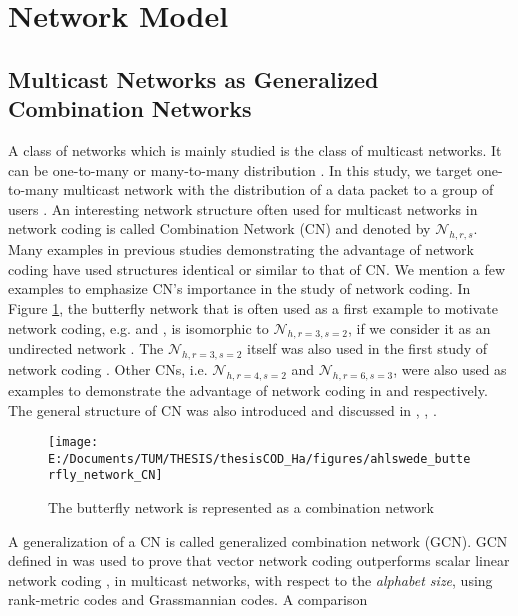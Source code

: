 \section{Network Model}

\subsection{Multicast Networks as Generalized Combination Networks}

A class of networks which is mainly studied is the class of multicast
networks. It can be one-to-many or many-to-many distribution \cite{Harte:2008}.
In this study, we target one-to-many multicast network with the distribution
of a data packet to a group of users \cite{Zhang:2012}. An interesting
network structure often used for multicast networks in network coding
is called Combination Network (CN) and denoted by $\mathcal{N}_{h,r,s}$.
Many examples in previous studies demonstrating the advantage of network
coding have used structures identical or similar to that of CN. We
mention a few examples to emphasize CN's importance in the study of
network coding. In Figure \ref{fig:butterfly_nw_cn}, the butterfly
network that is often used as a first example to motivate network
coding, e.g. \cite[Fig. 7]{Ahlswede:2000} and \cite[Fig. 1]{Sanders:2003},
is isomorphic to $\mathcal{N}_{h,r=3,s=2}$, if we consider it as
an undirected network \cite{Maheshwar:2012}. The $\mathcal{N}_{h,r=3,s=2}$
itself was also used in the first study of network coding \cite{Ahlswede:2000}.
Other CNs, i.e. $\mathcal{N}_{h,r=4,s=2}$ and $\mathcal{N}_{h,r=6,s=3}$,
were also used as examples to demonstrate the advantage of network
coding in \cite[Fig. 2]{Sanders:2003} and \cite[Fig. 2]{Jaggi:2005}
respectively. The general structure of CN was also introduced and
discussed in \cite[Sec. 4.3]{Fragouli:2006}, \cite[Sec. 4.1]{Yeung:2006},
\cite{Ngai:2004,Xiao:2007}.
\begin{figure}[H]
\caption{The butterfly network is represented as a combination network \label{fig:butterfly_nw_cn}}

\centering{}\texttt{[image: E:/Documents/TUM/THESIS/thesisCOD\_Ha/figures/ahlswede\_butterfly\_network\_CN]}
\end{figure}
A generalization of a CN \cite{Riis:2006} is called generalized combination
network (GCN). GCN defined in \cite{Etzion:2016,Wachter-Zeh:2018}
was used to prove that vector network coding outperforms scalar linear
network coding , in multicast networks, with respect to the \textit{alphabet
size}, using rank-metric codes and Grassmannian codes. A comparison
